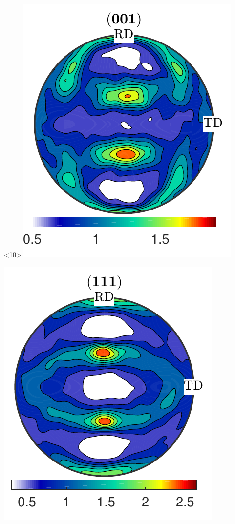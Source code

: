 \documentclass[compress]{beamer}
\begin{document}
\begin{frame}[fragile]
\begin{columns}
\begin{column}{0.29\textwidth}
                        \begin{onlyenv}<10>
        \includegraphics[width=\textwidth]{pic/rolling001_7}

      \includegraphics[width=\textwidth]{pic/rolling111_7}
    \end{onlyenv}


\end{column}
\end{columns}
\end{frame}
\end{document}
